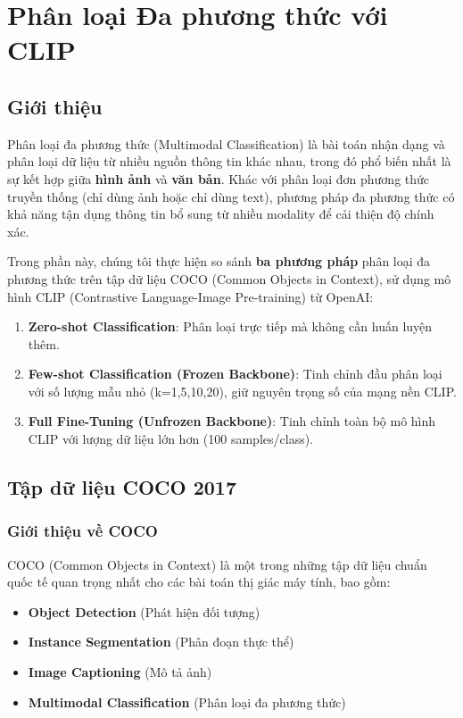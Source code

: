 \section{Phân loại Đa phương thức với CLIP}\label{sec:multimodal}

\subsection{Giới thiệu}
Phân loại đa phương thức (Multimodal Classification) là bài toán nhận dạng và phân loại dữ liệu từ nhiều nguồn thông tin khác nhau, trong đó phổ biến nhất là sự kết hợp giữa \textbf{hình ảnh} và \textbf{văn bản}. Khác với phân loại đơn phương thức truyền thống (chỉ dùng ảnh hoặc chỉ dùng text), phương pháp đa phương thức có khả năng tận dụng thông tin bổ sung từ nhiều modality để cải thiện độ chính xác.

Trong phần này, chúng tôi thực hiện so sánh \textbf{ba phương pháp} phân loại đa phương thức trên tập dữ liệu COCO (Common Objects in Context), sử dụng mô hình CLIP (Contrastive Language-Image Pre-training) từ OpenAI:

\begin{enumerate}
    \item \textbf{Zero-shot Classification}: Phân loại trực tiếp mà không cần huấn luyện thêm.
    \item \textbf{Few-shot Classification (Frozen Backbone)}: Tinh chỉnh đầu phân loại với số lượng mẫu nhỏ (k=1,5,10,20), giữ nguyên trọng số của mạng nền CLIP.
    \item \textbf{Full Fine-Tuning (Unfrozen Backbone)}: Tinh chỉnh toàn bộ mô hình CLIP với lượng dữ liệu lớn hơn (100 samples/class).
\end{enumerate}

\subsection{Tập dữ liệu COCO 2017}\label{subsec:coco-dataset}

\subsubsection{Giới thiệu về COCO}
COCO (Common Objects in Context) là một trong những tập dữ liệu chuẩn quốc tế quan trọng nhất cho các bài toán thị giác máy tính, bao gồm:
\begin{itemize}
    \item \textbf{Object Detection} (Phát hiện đối tượng)
    \item \textbf{Instance Segmentation} (Phân đoạn thực thể)
    \item \textbf{Image Captioning} (Mô tả ảnh)
    \item \textbf{Multimodal Classification} (Phân loại đa phương thức)
\end{itemize}

